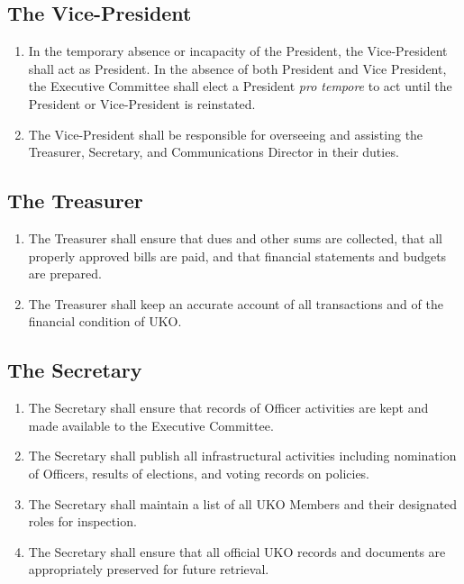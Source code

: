 \documentclass[12pt,executivepaper]{article}
\begin{document}
\subsection{The Vice-President}
\begin{enumerate}
    \item In the temporary absence or incapacity of the President, the
          Vice-President shall act as President. In the absence of both
          President and Vice President, the Executive Committee shall elect a
          President \textit{pro tempore} to act until the President or
          Vice-President is reinstated.
    \item The Vice-President shall be responsible for overseeing and assisting
          the Treasurer, Secretary, and Communications Director in their
          duties.
\end{enumerate}

\subsection{The Treasurer}
\begin{enumerate}
    \item The Treasurer shall ensure that dues and other sums are collected, that all
          properly approved bills are paid, and that financial statements and budgets
          are prepared.
    \item The Treasurer shall keep an accurate account of all transactions and of the
          financial condition of UKO.
\end{enumerate}

\subsection{The Secretary}
\begin{enumerate}
    \item The Secretary shall ensure that records of Officer activities are kept and made
          available to the Executive Committee.
    \item The Secretary shall publish all infrastructural activities including nomination
          of Officers, results of elections, and voting records on policies.
    \item The Secretary shall maintain a list of all UKO Members and their designated roles
          for inspection.
    \item The Secretary shall ensure that all official UKO records and documents are
          appropriately preserved for future retrieval.
\end{enumerate}
\end{document}

